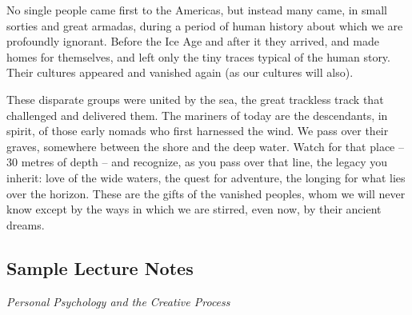 \documentclass[10pt,DIV09,letterpaper,oneside,headsepline]{scrreprt}
\begin{document}
No single people came first to the Americas, but instead many came, in
small sorties and great armadas, during a period of human history
about which we are profoundly ignorant. Before the Ice Age and after
it they arrived, and made homes for themselves, and left only the tiny
traces typical of the human story. Their cultures appeared and
vanished again (as our cultures will also).

These disparate groups were united by the sea, the great trackless
track that challenged and delivered them. The mariners of today are
the descendants, in spirit, of those early nomads who first harnessed
the wind. We pass over their graves, somewhere between the shore and
the deep water. Watch for that place -- 30 metres of depth -- and
recognize, as you pass over that line, the legacy you inherit: love of
the wide waters, the quest for adventure, the longing for what lies
over the horizon. These are the gifts of the vanished peoples, whom we
will never know except by the ways in which we are stirred, even now,
by their ancient dreams.

\newpage
\subsection{Sample Lecture Notes}
\textit{Personal Psychology and the Creative Process}
\end{document}

